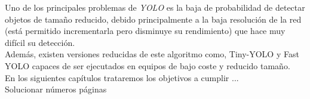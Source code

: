 Uno de los principales problemas de \textit{YOLO} es la baja de probabilidad de detectar objetos de tamaño reducido, debido principalmente a la baja resolución de la red (está permitido incrementarla pero disminuye su rendimiento) que hace muy difícil su detección.\\

Además, existen versiones reducidas de este algoritmo como, Tiny-YOLO y Fast YOLO capaces de ser ejecutados en equipos de bajo coste y reducido tamaño.\\

En los siguientes capítulos trataremos los objetivos a cumplir ...\\
Solucionar números páginas